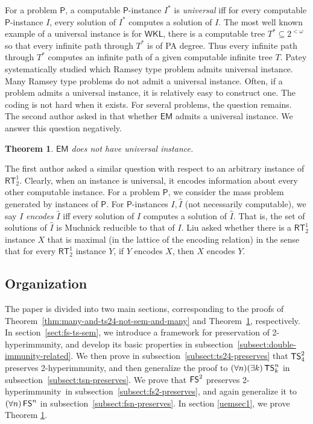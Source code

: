 \documentclass{amsart}
\newtheorem{theorem}{Theorem}[section]
\theoremstyle{definition}
\theoremstyle{remark}
\numberwithin{equation}{section}
\theoremstyle{noparens}
\def\propertyL{2-hyperimmunity}
\def\msf{\mathsf}
\newcommand{\s}[1]{\ensuremath{\sf{#1}}}
\DeclareMathOperator{\ts}{\s{TS}}
\DeclareMathOperator{\fs}{\s{FS}}
\def\h{\hat}
\begin{document}
For a problem $\msf{P}$, a
computable $\msf{P}$-instance $I^*$ is
 \emph{universal} iff for every computable $\msf{P}$-instance
 $I$, every solution of $I^*$ computes a solution of $I$.
 The most well known example of a universal instance is
 for $\msf{WKL}$, there is a computable tree $T^*\subseteq 2^{<\omega}$ so that every infinite path through
  $T^*$ is of PA degree. Thus every infinite path through $T^*$
 computes an infinite path of a given computable infinite tree $ T$.
 Patey \cite{patey2015degrees} systematically studied which Ramsey type problem admits universal instance.
Many Ramsey type problems do not admit a universal instance.
Often, if a problem admits a universal instance, it is relatively easy to construct
one.  The coding is not hard when it exists.
 For several problems, the question remains.
The second author asked in \cite{Patey2015Open} that whether $\msf{EM}$
admits a universal instance.
We answer this question negatively.
\begin{theorem}
\label{uemth1}
$\msf{EM}$ does not have universal instance.
\end{theorem}
The first author asked a similar question with respect to an arbitrary instance
of $\msf{RT}_2^1$.
Clearly, when an instance is universal, it encodes information about
every other computable instance.
For a problem $\msf{P}$, we consider the mass problem generated by instances of $\msf{P}$.
For $\msf{P}$-instances $I,\h I$ (not necessarily computable), we say $I$ \emph{encodes} $\h I$ iff
every solution of $I$ computes a solution of $\h I$. That is,
the set of solutions of $\h I$ is Muchnick reducible to that of $I$.
Liu \cite{Liu2015Cone} asked whether there is a $\msf{RT}_2^1$ instance $X$
 that is maximal
(in the lattice of the encoding relation) in the sense that
for every $\msf{RT}_2^1$ instance $Y$, if $Y$ encodes $X$, then
$X$ encodes $Y$.




\subsection{Organization}
The paper is divided into two main sections, corresponding to the proofs
of Theorem~\ref{thm:many-and-ts24-not-sem-and-many} and Theorem~\ref{uemth1},
respectively. In section~\ref{sect:fs-ts-sem}, we introduce a framework
for preservation of \propertyL, and develop its basic properties in subsection~\ref{subsect:double-immunity-related}.
We then prove in subsection~\ref{subsect:ts24-preserves} that $\ts^2_4$ preserves \propertyL, and then generalize the proof
to $(\forall n)(\exists k)\ts^n_k$ in subsection~\ref{subsect:tsn-preserves}. We prove that $\fs^2$
preserves \propertyL\ in subsection~\ref{subsect:fs2-preserves}, and again generalize it to $(\forall n)\fs^n$
in subsection~\ref{subsect:fsn-preserves}.
In section \ref{uemsec1}, we prove Theorem \ref{uemth1}.
\end{document}
